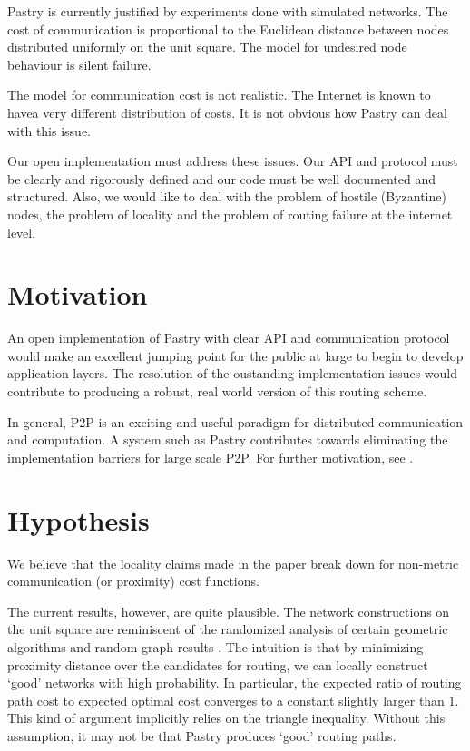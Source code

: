 \documentclass{article}
\begin{document}
Pastry is currently justified by experiments done with simulated
networks.  The cost of communication is proportional to the Euclidean
distance between nodes distributed uniformly on the unit square.  The
model for undesired node behaviour is silent failure.  

The model for communication cost is not realistic.  The Internet is
known to havea very different distribution of costs.  It is not obvious how
Pastry can deal with this issue.

Our open implementation must address these issues.  Our API and
protocol must be
clearly and rigorously defined and our code must be well documented
and structured.  Also, we would like to deal with the problem of
hostile (Byzantine) nodes, the problem of locality and the problem of
routing failure at the internet level.


\section{Motivation}

An open implementation of Pastry with clear API and communication
protocol would make an excellent jumping point for the public at large
to begin to develop application layers.  The resolution of the
oustanding implementation issues would contribute to producing a
robust, real world version of this routing scheme.

In general, P2P is an exciting and useful paradigm for distributed
communication and computation.  A system such as Pastry contributes
towards eliminating the implementation barriers for large scale P2P.
For further motivation, see \cite{CSW00, Nap, Gnu}.

\section{Hypothesis}

We believe that the locality claims made in the paper break down for
non-metric communication (or proximity) cost functions.  

The current results, however, are quite plausible.  The network constructions
on the unit square are reminiscent of the randomized analysis of
certain geometric algorithms and random graph results \cite{MR96}. The
intuition is that by minimizing proximity distance over the candidates
for routing, we can locally construct `good' networks with high
probability.  In particular, the expected ratio of routing path cost
to expected optimal cost converges to a constant slightly larger than
$1$.  This kind of argument implicitly relies on the triangle
inequality.  Without this assumption, it may not be that Pastry
produces `good' routing paths.
\end{document}
